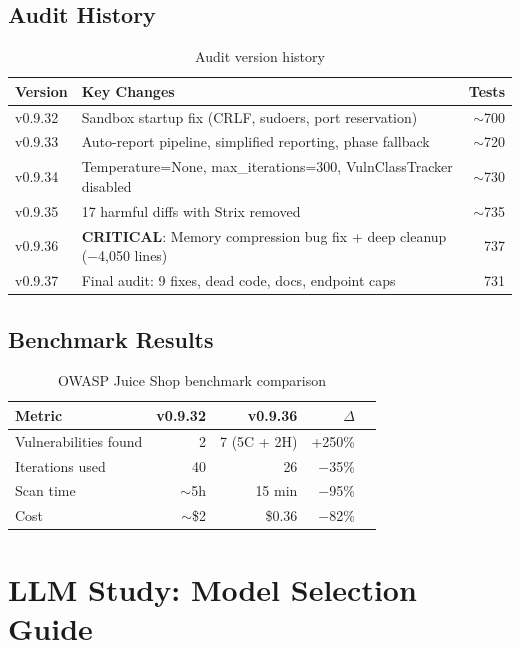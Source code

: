 \documentclass[12pt,a4paper]{report}
\begin{document}
\section{Audit History}
\begin{table}[H]
\centering
\caption{Audit version history}
\label{tab:audit}
\begin{tabular}{lp{8cm}r}
\toprule
\textbf{Version} & \textbf{Key Changes} & \textbf{Tests} \\
\midrule
v0.9.32 & Sandbox startup fix (CRLF, sudoers, port reservation) & $\sim$700 \\
v0.9.33 & Auto-report pipeline, simplified reporting, phase fallback & $\sim$720 \\
v0.9.34 & Temperature=None, max\_iterations=300, VulnClassTracker disabled & $\sim$730 \\
v0.9.35 & 17 harmful diffs with Strix removed & $\sim$735 \\
v0.9.36 & \textbf{CRITICAL}: Memory compression bug fix + deep cleanup ($-$4,050 lines) & 737 \\
v0.9.37 & Final audit: 9 fixes, dead code, docs, endpoint caps & 731 \\
\bottomrule
\end{tabular}
\end{table}

\section{Benchmark Results}
\begin{table}[H]
\centering
\caption{OWASP Juice Shop benchmark comparison}
\label{tab:benchmark}
\begin{tabular}{lrrrr}
\toprule
\textbf{Metric} & \textbf{v0.9.32} & \textbf{v0.9.36} & \textbf{$\Delta$} \\
\midrule
Vulnerabilities found   & 2       & 7 (5C + 2H) & +250\% \\
Iterations used         & 40      & 26           & $-$35\% \\
Scan time               & $\sim$5h & 15 min      & $-$95\% \\
Cost                    & $\sim$\$2 & \$0.36      & $-$82\% \\
\bottomrule
\end{tabular}
\end{table}


\chapter{LLM Study: Model Selection Guide}
\label{ch:llmstudy}
\end{document}
